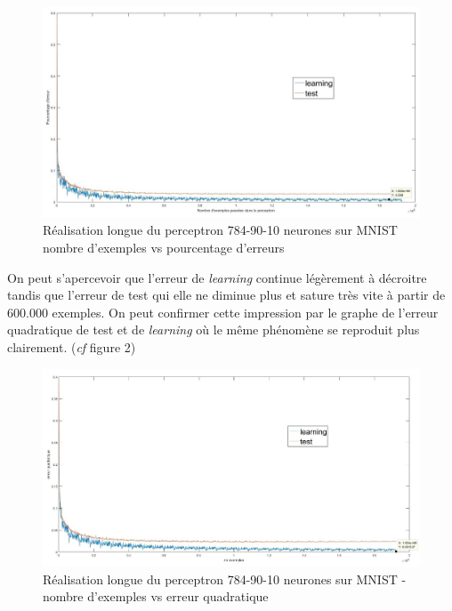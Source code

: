 \documentclass[a4paper,oneside]{report}
\begin{document}
\begin{figure}[!ht]
	\begin{center}
		\includegraphics[scale=0.30]{Images/courbes_error_longue.jpg} 
	\end{center}
\caption{Réalisation longue du perceptron 784-90-10 neurones sur MNIST nombre d'exemples vs pourcentage d'erreurs}
\end{figure}


On peut s'apercevoir que l'erreur de \textit{learning} continue légèrement à décroitre tandis que l'erreur de test qui elle ne diminue plus et sature très vite à partir de 600.000 exemples. On peut confirmer cette impression par le graphe de l'erreur quadratique de test et de \textit{learning} où le même phénomène se reproduit plus clairement.
(\textit{cf} figure 2)  


\begin{figure}[!ht]
	\begin{center}
	\includegraphics[scale=0.27]{Images/courbes_quaderror_longue.jpg} 
	\caption{Réalisation longue du perceptron 784-90-10 neurones sur MNIST - nombre d'exemples vs erreur quadratique} 
	\end{center}
\end{figure}
\end{document}

